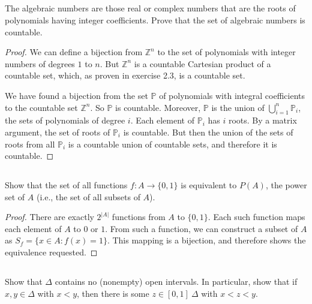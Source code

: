\subsection{} The algebraic numbers are those real or complex numbers that are the roots of polynomials having integer coefficients.  Prove that  the  set of algebraic numbers  is countable.

\begin{proof}
We can define a bijection from $\mathbb{Z}^n$ to the set of polynomials with integer numbers of degrees $1$ to $n$. But $\mathbb{Z}^n$ is a countable Cartesian product of a countable set, which, as proven in exercise 2.3, is a countable set.

We have found a bijection from the set $\mathbb{P}$ of polynomials with integral coefficients to the countable set $\mathbb{Z}^n$. So $\mathbb{P}$ is countable. Moreover, $\mathbb{P}$ is the union of $\bigcup_{i=1}^n \mathbb{P}_i$, the sets of polynomials of degree $i$. Each element of $\mathbb{P}_i$ has $i$ roots. By a matrix argument, the set of roots of $\mathbb{P}_i$ is countable. But then the union of the sets of roots from all $\mathbb{P}_i$ is a countable union of countable sets, and therefore it is countable.

\end{proof}


\subsection{} Show that the set of all functions $f : A \rightarrow \{0,  1\}$ is equivalent to $P(A)$, the power set of $A$ (i.e., the set of all subsets of $A$).

\begin{proof}
There are exactly $2^{|A|}$ functions from $A$ to $\{0,1\}$. Each such function maps each element of $A$ to $0$ or $1$. From such a function, we can construct a subset of $A$ as $S_f=\{x \in A : f(x) = 1\}$. This mapping is a bijection, and therefore shows the equivalence requested.

\end{proof}


\subsection{} Show that $\Delta$ contains no (nonempty) open intervals. In particular,    show that if $x, y \in \Delta$ with $x < y$, then there is some $z \in [ 0, 1 ] \ \Delta$ with $x < z < y$.

